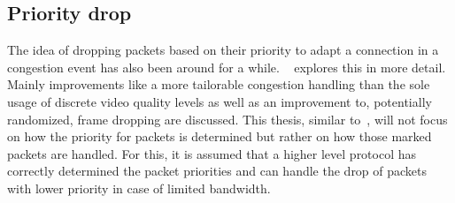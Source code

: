 \subsection{Priority drop}
The idea of dropping packets based on their priority to adapt a connection
in a congestion event has also been around for a while.
~\parencite{media-streaming-prio-drop} explores this in more detail.
Mainly improvements like a more tailorable congestion handling than the sole usage
of discrete video quality levels as well as an improvement to, potentially 
randomized, frame dropping are discussed.
This thesis, similar to~\parencite{media-streaming-prio-drop}, will not focus
on how the priority for packets is determined but rather on how those marked
packets are handled.
For this, it is assumed that a higher level protocol has correctly determined 
the packet priorities and can handle the drop of packets with lower priority
in case of limited bandwidth.
